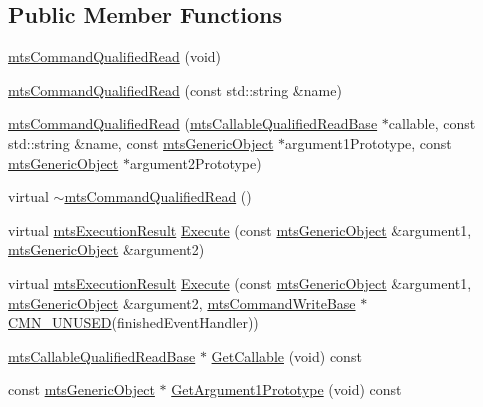\subsection*{Public Member Functions}
\begin{DoxyCompactItemize}
\item 
\hyperlink{classmts_command_qualified_read_a8e6ae9f298cbc23e90768ace8842035d}{mts\+Command\+Qualified\+Read} (void)
\item 
\hyperlink{classmts_command_qualified_read_a0a67c7082075e6033ea28aa42aae8620}{mts\+Command\+Qualified\+Read} (const std\+::string \&name)
\item 
\hyperlink{classmts_command_qualified_read_a5e45546521fe7cc27a066a9f739481be}{mts\+Command\+Qualified\+Read} (\hyperlink{classmts_callable_qualified_read_base}{mts\+Callable\+Qualified\+Read\+Base} $\ast$callable, const std\+::string \&name, const \hyperlink{classmts_generic_object}{mts\+Generic\+Object} $\ast$argument1\+Prototype, const \hyperlink{classmts_generic_object}{mts\+Generic\+Object} $\ast$argument2\+Prototype)
\item 
virtual \hyperlink{classmts_command_qualified_read_a10dd4312bf5540ab1d6920b340d19416}{$\sim$mts\+Command\+Qualified\+Read} ()
\item 
virtual \hyperlink{classmts_execution_result}{mts\+Execution\+Result} \hyperlink{classmts_command_qualified_read_a73cccb8b94623c25bcda6b4f34cdfb78}{Execute} (const \hyperlink{classmts_generic_object}{mts\+Generic\+Object} \&argument1, \hyperlink{classmts_generic_object}{mts\+Generic\+Object} \&argument2)
\item 
virtual \hyperlink{classmts_execution_result}{mts\+Execution\+Result} \hyperlink{classmts_command_qualified_read_ae04d6c7d7c4b92a39aeaf4917fa4bead}{Execute} (const \hyperlink{classmts_generic_object}{mts\+Generic\+Object} \&argument1, \hyperlink{classmts_generic_object}{mts\+Generic\+Object} \&argument2, \hyperlink{classmts_command_write_base}{mts\+Command\+Write\+Base} $\ast$\hyperlink{cmn_portability_8h_a021894e2626935fa2305434b1e893ff6}{C\+M\+N\+\_\+\+U\+N\+U\+S\+E\+D}(finished\+Event\+Handler))
\item 
\hyperlink{classmts_callable_qualified_read_base}{mts\+Callable\+Qualified\+Read\+Base} $\ast$ \hyperlink{classmts_command_qualified_read_a6466134df979d8aebe21de71917eb967}{Get\+Callable} (void) const 
\item 
const \hyperlink{classmts_generic_object}{mts\+Generic\+Object} $\ast$ \hyperlink{classmts_command_qualified_read_abe69997dbd70d429668e14861936e179}{Get\+Argument1\+Prototype} (void) const 

\end{DoxyCompactItemize}
